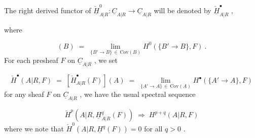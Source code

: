\begin{center}
\end{center}
The right derived functor of  $\check{\underline{H}}^{0}_{A|R} : \underline{C}_{A|R} \to \underline{C}_{A|R}$  will be denoted by  $\check{\underline{H}}^{\bullet}_{A|R}$ ,

where

\begin{equation*}
[\check{\underline{H}}^{0}_{A|R}(F)](B) \;=\; \lim_{\{B' \to B\}\, \in\, \mathrm{Cov}(B)} H^{0}(\{B' \to B\},F) \ .
\end{equation*}
For each presheaf  $F$  on  $\underline{C}_{A|R}$  , we set

\begin{equation*}
\check{H}^{\bullet}(A|R,F) \;=\; [\check{H}^{\bullet}_{A|R}(F)](A) \;=\; \lim_{\{A' \to A\}\, \in\, \mathrm{Cov}(A)} H^{\bullet}(\{A' \to A\},F)
\end{equation*}
for any sheaf  $F$  on  $\underline{C}_{A|R}$  , we have the usual spectral sequence

\begin{equation*}
\check{H}^{p}(A|R,\underline{H}^{q}_{A|R}(F)) \;\Rightarrow\; H^{p+q}(A|R,F)
\end{equation*}
where we note that  $\check{H}^{0}(A|R,\underline{H}^{q}(F)) = 0$  for all  $q > 0$ .

